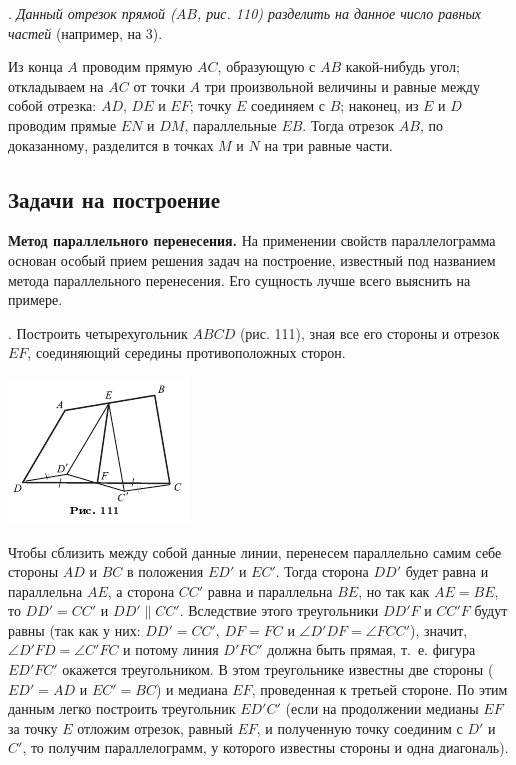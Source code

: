 \documentclass[oneside]{book}
\begin{document}
.
\emph{Данный отрезок прямой \emph{($AB$, рис. 110)} разделить на данное число равных частей} (например, на 3).

Из конца $A$ проводим прямую $AC$, образующую с $AB$ какой-нибудь угол;
откладываем на $AC$ от точки $A$ три произвольной величины и равные между собой отрезка:
$AD$, $DE$ и $EF$;
точку $E$ соединяем с $B$;
наконец, из $E$ и $D$ проводим прямые $EN$ и $DM$, параллельные $EB$.
Тогда отрезок $AB$, по доказанному, разделится в точках $M$ и $N$ на три равные части.

\subsection*{Задачи на построение}

\textbf{Метод параллельного перенесения.}
На применении свойств параллелограмма основан особый прием решения задач на построение, известный под названием метода параллельного перенесения.
Его сущность лучше всего выяснить на примере.

.
Построить четырехугольник $ABCD$ (рис. 111), зная все его стороны и отрезок $EF$, соединяющий середины противоположных сторон.

\includegraphics{pics/ris-111}

Чтобы сблизить между собой данные линии, перенесем параллельно самим себе стороны $AD$ и $BC$ в положения $ED'$ и $EC'$.
Тогда сторона $DD'$ будет равна и параллельна $AE$, а сторона $CC'$ равна и параллельна $BE$, но так как $AE=BE$, то $DD'=CC'$ и $DD'\parallel CC'$.
Вследствие этого треугольники $DD'F$ и $CC'F$ будут равны (так как у них:
$DD' = CC'$, $DF=FC$ и $\angle D'DF=\angle FCC'$), значит, $\angle D'FD=\angle C'FC$ и потому линия $D'FC'$ должна быть прямая, т.~е.
фигура $ED'FC'$ окажется треугольником.
В этом треугольнике известны две стороны ($ED'=AD$ и $EC'=BC$) и медиана $EF$, проведенная к третьей стороне.
По этим данным легко построить треугольник $ED'C'$ (если на продолжении медианы $EF$ за точку $E$ отложим отрезок, равный $EF$, и полученную точку соединим с $D'$ и $C'$, то получим параллелограмм, у которого известны стороны и одна диагональ).
\end{document}
